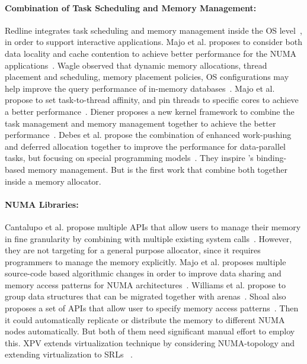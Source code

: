 \paragraph{Combination of Task Scheduling and Memory Management:} Redline integrates task scheduling and memory management inside the OS level~\citep{Redline}, in order to support  interactive applications. 
Majo et al. proposes to consider both data locality and cache contention to achieve better performance for the NUMA applications~\citep{Majo:2011:MMN:1993478.1993481}. Wagle observed that dynamic memory allocations, thread placement and scheduling, memory placement policies, OS configurations may help improve the query performance of in-memory databases~\citep{wagle2015numa}.  Majo et al. propose to set task-to-thread affinity, and pin threads to specific cores to achieve a better performance~\citep{Majo:2015:LPC:2688500.2688509}. Diener proposes a new kernel framework to combine the task management and memory management together to achieve the better performance~\citep{diener2015automatic}. 
Debes et al. propose the combination of enhanced work-pushing and deferred allocation together to improve the performance for data-parallel tasks, but focusing on special programming models~\citep{DBLP:conf/IEEEpact/DrebesPH0D16}. They inspire \NM{}'s binding-based memory management. But \NM{} is the first work that combine both together inside a memory allocator. 



\paragraph{NUMA Libraries:}
Cantalupo et al. propose multiple APIs that allow users to manage their memory in fine granularity by combining with multiple existing system calls~\citep{cantalupo2015memkind}. However, they are not targeting for a general purpose allocator, since it requires programmers to manage the memory explicitly.  Majo et al. proposes multiple source-code based  algorithmic changes in order to improve  data sharing and  memory access patterns for NUMA architectures~\citep{6704666}. Williams et al. propose to group data structures that can be migrated together with arenas~\citep{WilliamsI0L18}. 
Shoal also proposes a set of APIs that allow user to specify memory access patterns~\citep{Kaestle:2015:SSA:2813767.2813787}. Then it could automatically replicate or distribute the memory  to different NUMA nodes automatically. But both of them need significant manual effort to employ this. 
XPV extends virtualization technique by considering NUMA-topology and extending virtualization to SRLs ~\citep{Bui:2019:EPV:3302424.3303960}.

